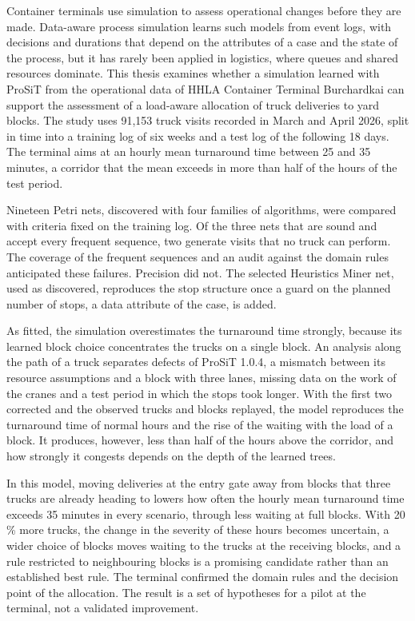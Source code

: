 
Container terminals use simulation to assess operational changes before they are
made. Data-aware process simulation learns such models from event logs, with decisions and
durations that depend on the attributes of a case and the state of the process, but
it has rarely been applied in logistics, where queues and shared resources
dominate. This thesis examines whether a simulation learned with ProSiT from the
operational data of HHLA Container Terminal Burchardkai can support the assessment
of a load-aware allocation of truck deliveries to yard blocks. The study uses
91,153 truck visits recorded in March and April 2026, split in time into a training
log of six weeks and a test log of the following 18 days. The terminal aims at
an hourly mean turnaround time between 25 and 35 minutes, a corridor that the mean
exceeds in more than half of the hours of the test period.

Nineteen Petri nets, discovered with four families of algorithms, were compared with
criteria fixed on the training log. Of the three nets that are sound and accept every
frequent sequence, two generate visits that no truck can perform. The coverage of the
frequent sequences and an audit against the domain rules anticipated these failures.
Precision did not. The selected Heuristics Miner net,
used as discovered, reproduces the stop structure once a guard on the planned number
of stops, a data attribute of the case, is added.

As fitted, the simulation overestimates the turnaround time strongly, because its
learned block choice concentrates the trucks on a single block. An analysis along the
path of a truck separates defects of ProSiT 1.0.4, a mismatch between its resource
assumptions and a block with three lanes, missing data on the work of the cranes and a
test period in which the stops took longer. With the first two corrected and the
observed trucks and blocks replayed, the model reproduces the turnaround time of
normal hours and the rise of the waiting with the load of a block. It
produces, however, less than half of the hours above the corridor, and how strongly
it congests depends on the depth of the learned trees.

In this model, moving deliveries at the entry gate away from blocks that three trucks
are already heading to lowers how often the hourly mean turnaround time exceeds
35 minutes in every scenario, through less waiting at full blocks. With 20\,\% more
trucks, the change in the severity of these hours becomes uncertain, a wider choice of
blocks moves waiting to the trucks at the receiving blocks, and a rule restricted to neighbouring blocks is a promising candidate
rather than an established best rule. The terminal confirmed the domain rules and the
decision point of the allocation. The result is a set of hypotheses for a pilot at the terminal, not a validated
improvement.
